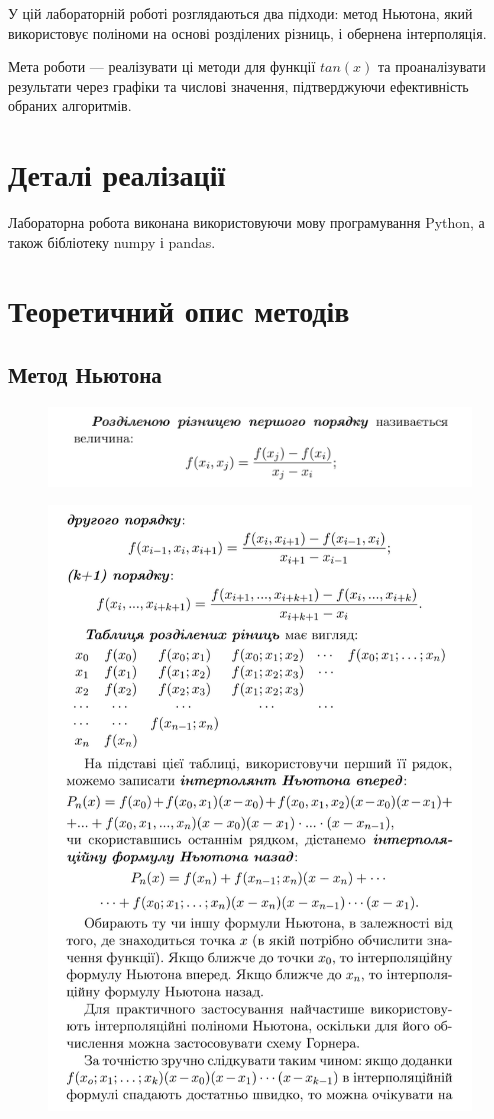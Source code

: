 \documentclass[a4paper, 12pt]{article}
\begin{document}
У цій лабораторній роботі розглядаються два підходи: метод Ньютона, який використовує поліноми на основі розділених різниць, і обернена інтерполяція.

Мета роботи — реалізувати ці методи для функції $tan(x)$ та проаналізувати результати через графіки та числові значення, підтверджуючи ефективність обраних алгоритмів.

\section{Деталі реалізації}

Лабораторна робота виконана використовуючи мову програмування Python, а також бібліотеку numpy і pandas.

\clearpage
\section{Теоретичний опис методів}
\subsection{Метод Ньютона}

\begin{figure}[ht]
	\centering
	\includegraphics[width=0.7\linewidth]{./img/inter1.png}
\end{figure}
\begin{figure}[ht]
	\centering
	\includegraphics[width=0.7\linewidth]{./img/inter2.png}
\end{figure}
\end{document}
